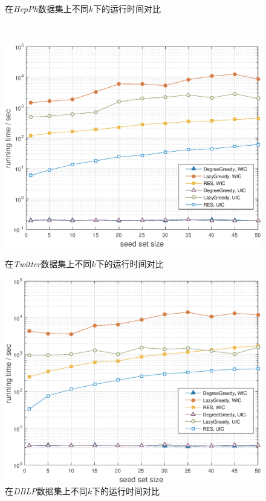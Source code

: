 \begin{figure}[!ht]
\begin {minipage}{0.48\textwidth}
     \caption{在\textit{HepPh}数据集上不同$k$下的运行时间对比}
     \label{fig:hepPhTime}
   \end{minipage}
   \\
   \begin{minipage}{0.48\textwidth}
     \centering
     \includegraphics[width=\linewidth]{figures/twitterTime.eps}
     \caption{在\textit{Twitter}数据集上不同$k$下的运行时间对比}
     \label{fig:twitterTime}
   \end{minipage}
   \hfill
   \begin {minipage}{0.48\textwidth}
     \centering
     \includegraphics[width=\linewidth]{figures/dblpTime.eps}
     \caption{在\textit{DBLP}数据集上不同$k$下的运行时间对比}
     \label{fig:dblpTime}
   \end{minipage}
\end{figure}

